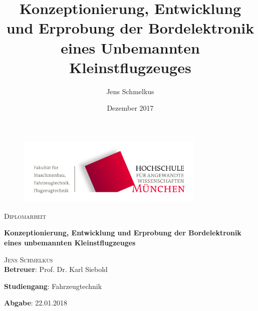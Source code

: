 \begin{titlepage}
\setcounter{page}{1}
\begin{center}
\begin{figure}[h!]
\vspace{0cm}
\centering
\includegraphics[width=0.8\textwidth]{bilder/Logos/FK03_CMYK_Block.png}
\\[0.8cm]
\end{figure}
\vspace{1.5cm}

{\fontsize{20}{60}\scshape Diplomarbeit} 
\\[1.1cm]

\begin{doublespace}
{\fontsize{30}{22}\selectfont \textbf{Konzeptionierung, Entwicklung und Erprobung der Bordelektronik eines unbemannten Kleinstflugzeuges}\par} 
\vspace{1.4cm}
\end{doublespace}

\title{Konzeptionierung, Entwicklung und Erprobung der Bordelektronik eines Unbemannten Kleinstflugzeuges}
\author{Jens Schmelkus}
\date{Dezember 2017}

{\fontsize{23}{60}\scshape Jens Schmelkus} 
\\[2.0cm]


\textbf{Betreuer}: Prof. Dr. Karl Siebold




\textbf{Studiengang}: Fahrzeugtechnik 

\textbf{Abgabe}: 22.01.2018

\vfill


\end{center}
\end{titlepage}
